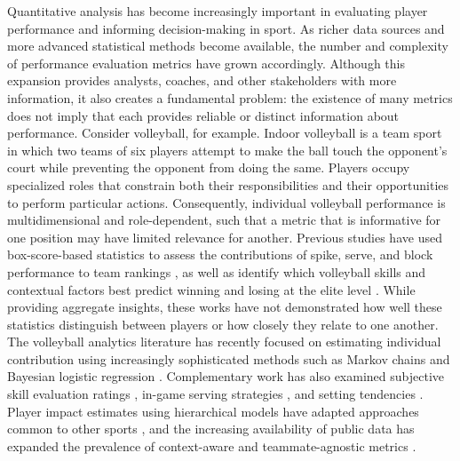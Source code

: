\documentclass[
  12pt]{article}
\begin{document}
Quantitative analysis has become increasingly important in evaluating
player performance and informing decision-making in sport. As richer
data sources and more advanced statistical methods become available, the
number and complexity of performance evaluation metrics have grown
accordingly. Although this expansion provides analysts, coaches, and
other stakeholders with more information, it also creates a fundamental
problem: the existence of many metrics does not imply that each provides
reliable or distinct information about performance. Consider volleyball,
for example. Indoor volleyball is a team sport in which two teams of six
players attempt to make the ball touch the opponent's court while
preventing the opponent from doing the same. Players occupy specialized
roles that constrain both their responsibilities and their opportunities
to perform particular actions. Consequently, individual volleyball
performance is multidimensional and role-dependent, such that a metric
that is informative for one position may have limited relevance for
another. Previous studies have used box-score-based statistics to assess
the contributions of spike, serve, and block performance to team
rankings \citep{marcelino_weight_2008}, as well as identify which
volleyball skills and contextual factors best predict winning and losing
at the elite level \citep{pena_which_2013}. While providing aggregate
insights, these works have not demonstrated how well these statistics
distinguish between players or how closely they relate to one another.
The volleyball analytics literature has recently focused on estimating
individual contribution using increasingly sophisticated methods such as
Markov chains and Bayesian logistic regression
\citep{miskin_skill_2010, powers_estimating_2025}. Complementary work
has also examined subjective skill evaluation ratings
\citep{bagley_bump_2017}, in-game serving strategies
\citep{burton_linear_2015}, and setting tendencies
\citep{raymond_attack_2024}. Player impact estimates using hierarchical
models have adapted approaches common to other sports
\citep{hass_exploring_2018, fellingham_evaluating_2022}, and the
increasing availability of public data has expanded the prevalence of
context-aware and teammate-agnostic metrics
\citep{evollve_glossary_2026}.
\end{document}
